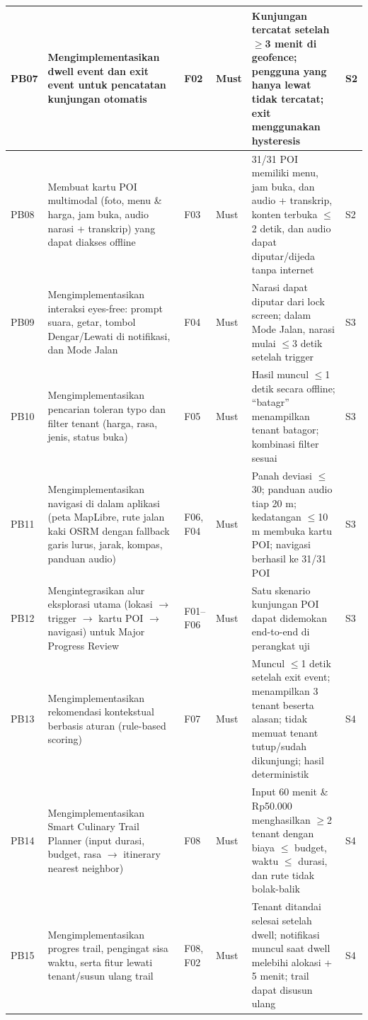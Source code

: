 \begin{longtable}{|L{0.118}|L{0.281}|L{0.172}|L{0.107}|L{0.208}|L{0.114}|}
PB07 & Mengimplementasikan dwell event dan exit event untuk pencatatan kunjungan otomatis & F02 & Must & Kunjungan tercatat setelah \(\ge\)3 menit di geofence; pengguna yang hanya lewat tidak tercatat; exit menggunakan hysteresis & S2 \\ \hline
PB08 & Membuat kartu POI multimodal (foto, menu \& harga, jam buka, audio narasi + transkrip) yang dapat diakses offline & F03 & Must & 31/31 POI memiliki menu, jam buka, dan audio + transkrip, konten terbuka \(\le\)2 detik, dan audio dapat diputar/dijeda tanpa internet & S2 \\ \hline
PB09 & Mengimplementasikan interaksi eyes-free: prompt suara, getar, tombol Dengar/Lewati di notifikasi, dan Mode Jalan & F04 & Must & Narasi dapat diputar dari lock screen; dalam Mode Jalan, narasi mulai \(\le\)3 detik setelah trigger & S3 \\ \hline
PB10 & Mengimplementasikan pencarian toleran typo dan filter tenant (harga, rasa, jenis, status buka) & F05 & Must & Hasil muncul \(\le\)1 detik secara offline; ``batagr'' menampilkan tenant batagor; kombinasi filter sesuai & S3 \\ \hline
PB11 & Mengimplementasikan navigasi di dalam aplikasi (peta MapLibre, rute jalan kaki OSRM dengan fallback garis lurus, jarak, kompas, panduan audio) & F06, F04 & Must & Panah deviasi \(\le\)30\textdegree{}; panduan audio tiap 20 m; kedatangan \(\le\)10 m membuka kartu POI; navigasi berhasil ke 31/31 POI & S3 \\ \hline
PB12 & Mengintegrasikan alur eksplorasi utama (lokasi \(\rightarrow\) trigger \(\rightarrow\) kartu POI \(\rightarrow\) navigasi) untuk Major Progress Review & F01--F06 & Must & Satu skenario kunjungan POI dapat didemokan end-to-end di perangkat uji & S3 \\ \hline
PB13 & Mengimplementasikan rekomendasi kontekstual berbasis aturan (rule-based scoring) & F07 & Must & Muncul \(\le\)1 detik setelah exit event; menampilkan 3 tenant beserta alasan; tidak memuat tenant tutup/sudah dikunjungi; hasil deterministik & S4 \\ \hline
PB14 & Mengimplementasikan Smart Culinary Trail Planner (input durasi, budget, rasa \(\rightarrow\) itinerary nearest neighbor) & F08 & Must & Input 60 menit \& Rp50.000 menghasilkan \(\ge\)2 tenant dengan biaya \(\le\) budget, waktu \(\le\) durasi, dan rute tidak bolak-balik & S4 \\ \hline
PB15 & Mengimplementasikan progres trail, pengingat sisa waktu, serta fitur lewati tenant/susun ulang trail & F08, F02 & Must & Tenant ditandai selesai setelah dwell; notifikasi muncul saat dwell melebihi alokasi + 5 menit; trail dapat disusun ulang & S4 \\ \hline

\end{longtable}
